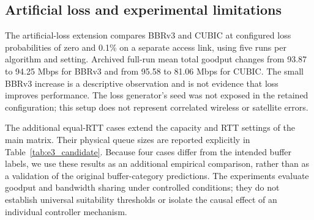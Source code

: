 


\subsection{Artificial loss and experimental limitations}
The artificial-loss extension compares BBRv3 and CUBIC at configured
loss probabilities of zero and 0.1\% on a separate access link,
using five runs per algorithm and setting. Archived full-run mean total
goodput changes from 93.87 to 94.25 Mbps for BBRv3 and from 95.58 to
81.06 Mbps for CUBIC. The small BBRv3 increase is a descriptive observation
and is not evidence that loss improves performance. The loss generator's
seed was not exposed in the retained configuration; this setup does not
represent correlated wireless or satellite errors.

The additional equal-RTT cases extend the capacity and RTT settings of
the main matrix. Their physical queue sizes are reported explicitly in
Table~\ref{tab:e3_candidate}. Because four cases differ from the intended
buffer labels, we use these results as an additional empirical comparison,
rather than as a validation of the original buffer-category predictions.
The experiments evaluate goodput and bandwidth sharing under controlled
conditions; they do not establish universal suitability thresholds or
isolate the causal effect of an individual controller mechanism.
